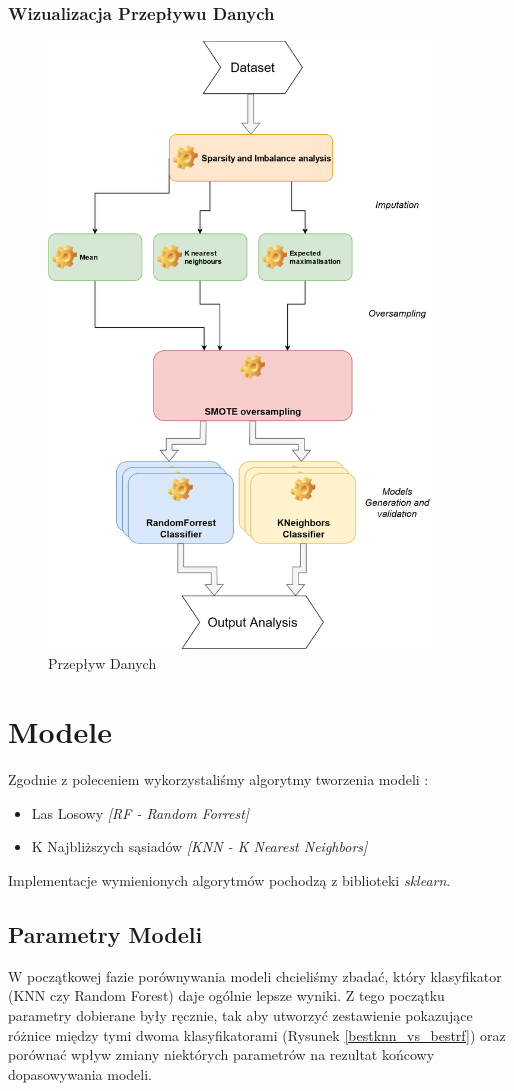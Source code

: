 \documentclass[11pt]{article}
\begin{document}
\subsubsection{Wizualizacja Przepływu Danych}
\begin{figure}[h]
	\caption{Przepływ Danych}
	\begin{center}
		\includegraphics[width=4in]{Dataflow-no-MICE}
	\end{center}
\end{figure}
\section{Modele}
Zgodnie z poleceniem wykorzystaliśmy algorytmy tworzenia modeli : 
\begin{itemize}
	\item Las Losowy \textit{[RF - Random Forrest]}
	\item K Najbliższych sąsiadów \textit{[KNN - K Nearest Neighbors]}
\end{itemize}
Implementacje wymienionych algorytmów pochodzą z biblioteki \textit{sklearn}.
\subsection{Parametry Modeli}
W początkowej fazie porównywania modeli chcieliśmy zbadać, który klasyfikator (KNN czy Random Forest) daje ogólnie lepsze wyniki. Z tego początku parametry dobierane były ręcznie, tak aby utworzyć zestawienie pokazujące różnice między tymi dwoma klasyfikatorami (Rysunek \ref{bestknn_vs_bestrf}) oraz porównać wpływ zmiany niektórych parametrów na rezultat końcowy dopasowywania modeli.
\end{document}
